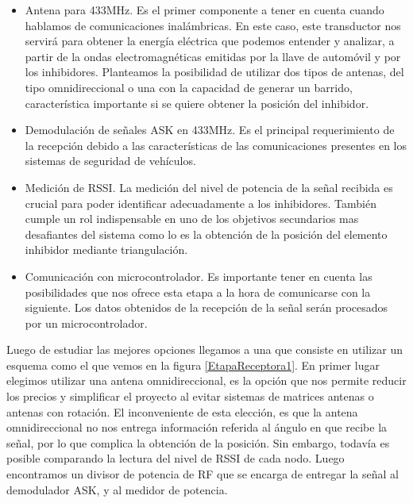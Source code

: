 \begin{itemize}
    \item Antena para 433MHz. Es el primer componente a tener en cuenta cuando hablamos de comunicaciones inalámbricas. En este caso, 
    este transductor nos servirá para obtener la energía eléctrica que podemos entender y analizar, a partir de la ondas electromagnéticas
    emitidas por la llave de automóvil y por los inhibidores. Planteamos la posibilidad de utilizar dos tipos de antenas, del tipo 
    omnidireccional o una con la capacidad de generar un barrido, característica importante si se quiere obtener la posición del inhibidor.

    \item Demodulación de señales ASK en 433MHz. Es el principal requerimiento de la recepción debido a las características de las 
    comunicaciones presentes en los sistemas de seguridad de vehículos.

    \item Medición de RSSI. La medición del nivel de potencia de la señal recibida es crucial para poder identificar adecuadamente
    a los inhibidores. También cumple un rol indispensable en uno de los objetivos secundarios mas desafiantes del sistema como lo es la obtención
    de la posición del elemento inhibidor mediante triangulación.

    \item Comunicación con microcontrolador. Es importante tener en cuenta las posibilidades que nos ofrece esta etapa a la hora de comunicarse
    con la siguiente. Los datos obtenidos de la recepción de la señal serán procesados por un microcontrolador.

\end{itemize}

Luego de estudiar las mejores opciones llegamos a una que consiste en utilizar un esquema como el que vemos en la figura
\ref{EtapaReceptora1}. En primer lugar elegimos utilizar una antena omnidireccional, es la opción que nos permite reducir los precios
y simplificar el proyecto al evitar sistemas de matrices antenas o antenas con rotación.
El inconveniente de esta elección, es que la antena omnidireccional no nos entrega información referida al ángulo en que recibe la señal, por lo que
complica la obtención de la posición. Sin embargo, todavía es posible comparando la lectura del nivel de RSSI de cada nodo.
Luego encontramos un divisor de potencia de RF que se encarga de entregar la señal al demodulador ASK, y al medidor de potencia. \par


